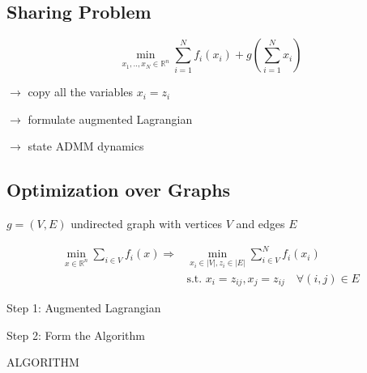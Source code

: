 \subsection{Sharing Problem}

\begin{equation}
	\min_{x_1,..,x_N \in \mathbb{R}^{n}}
	\sum_{i = 1}^{N} f_i(x_i)
	+g\left(\sum_{i = 1}^{N}x_i\right)
\end{equation}

$\rightarrow$ copy all the variables $x_i=z_i$

$\rightarrow$ formulate augmented Lagrangian

$\rightarrow$ state ADMM dynamics

\subsection{Optimization over Graphs}


$g=(V,E)$ undirected graph with vertices $V$ and edges $E$

$$\begin{aligned}
		\min_{x \in \mathbb{R}^{n}} \sum_{i\in V} f_i(x)
		\Rightarrow
		 & \min_{x_i\in|V|,z_i\in|E|} \sum_{i\in V}^{N} f_i(x_i)
		\\&\text{s.t. }x_i=z_{ij}, x_j=z_{ij}\quad \forall(i,j)\in E
	\end{aligned}$$

Step 1: Augmented Lagrangian

Step 2: Form the Algorithm

ALGORITHM
